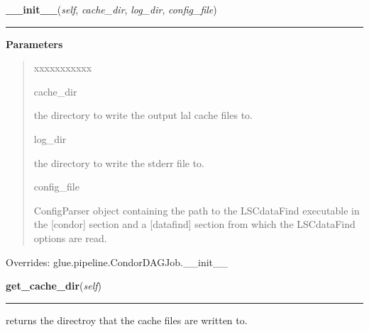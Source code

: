     \begin{boxedminipage}{\textwidth}

    \raggedright \textbf{\_\_init\_\_}(\textit{self}, \textit{cache\_dir}, \textit{log\_dir}, \textit{config\_file})

    \vspace{-1.5ex}

    \rule{\textwidth}{0.5\fboxrule}
    \vspace{1ex}

      \textbf{Parameters}
      \begin{quote}
        \begin{Ventry}{xxxxxxxxxxx}

          \item[cache\_dir]

          the directory to write the output lal cache files to.

          \item[log\_dir]

          the directory to write the stderr file to.

          \item[config\_file]

          ConfigParser object containing the path to the LSCdataFind 
          executable in the [condor] section and a [datafind] section 
          from which the LSCdataFind options are read.

        \end{Ventry}

      \end{quote}

    \vspace{1ex}

      Overrides: glue.pipeline.CondorDAGJob.\_\_init\_\_

    \end{boxedminipage}

    \label{stochastic:LSCDataFindJob:get_cache_dir}
    \vspace{0.5ex}

    \begin{boxedminipage}{\textwidth}

    \raggedright \textbf{get\_cache\_dir}(\textit{self})

    \vspace{-1.5ex}

    \rule{\textwidth}{0.5\fboxrule}
    returns the directroy that the cache files are written to.

    \vspace{1ex}

    \end{boxedminipage}

